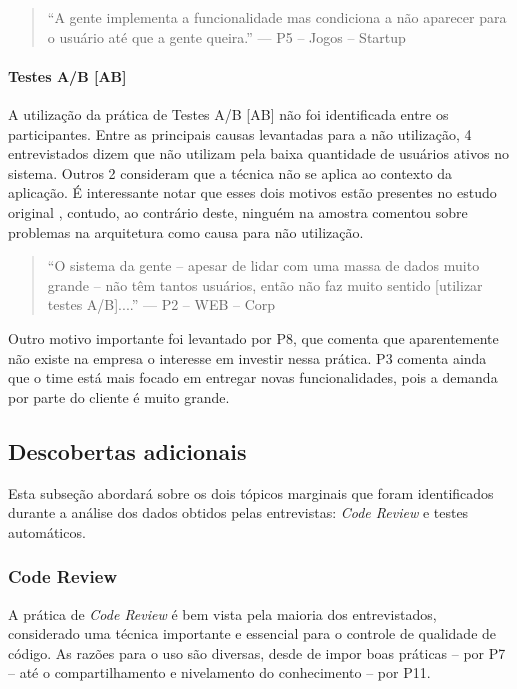\begin{quote}
    ``A gente implementa a funcionalidade mas condiciona a não aparecer para o usuário até que a gente queira.'' --- P5 -- Jogos -- Startup
\end{quote}

\paragraph{Testes A/B [AB]}

A utilização da prática de Testes A/B [AB] \cite{testsAB} não foi identificada entre os participantes. Entre as principais causas levantadas para a não utilização, 4 entrevistados dizem que não utilizam pela baixa quantidade de usuários ativos no sistema. Outros 2 consideram que a técnica não se aplica ao contexto da aplicação. É interessante notar que esses dois motivos estão presentes no estudo original \cite{empiricalStudy2016}, contudo, ao contrário deste, ninguém na amostra comentou sobre problemas na arquitetura como causa para não utilização.


\begin{quote}
    ``O sistema da gente -- apesar de lidar com uma massa de dados muito grande -- não têm tantos usuários, então não faz muito sentido [utilizar testes A/B]....'' --- P2 -- WEB -- Corp
\end{quote}

Outro motivo importante foi levantado por P8, que comenta que aparentemente não existe na empresa o interesse em investir nessa prática. P3 comenta ainda que o time está mais focado em entregar novas funcionalidades, pois a demanda por parte do cliente é muito grande.

\subsection{Descobertas adicionais}

Esta subseção abordará sobre os dois tópicos marginais que foram identificados durante a análise dos dados obtidos pelas entrevistas: \emph{Code Review} e testes automáticos.

\subsubsection{Code Review}

A prática de \emph{Code Review} \cite{codeReview} é bem vista pela maioria dos entrevistados, considerado uma técnica importante e essencial para o controle de qualidade de código. As razões para o uso são diversas, desde de impor boas práticas -- por P7 -- até o compartilhamento e nivelamento do conhecimento -- por P11.

